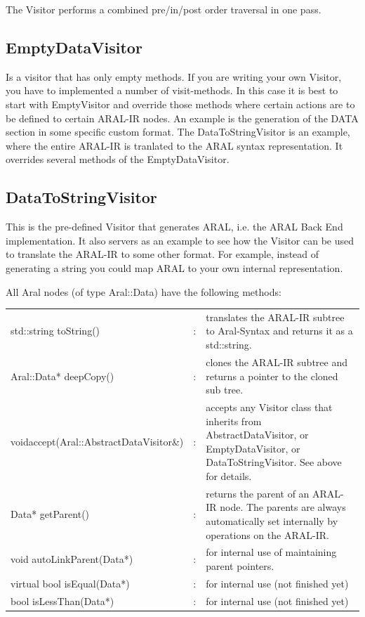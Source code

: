\documentclass[a4paper,12pt]{report}
\begin{document}
The Visitor performs a combined pre/in/post order traversal in one pass.

\subsection{EmptyDataVisitor}
Is a visitor that has only empty methods. If you are writing your own
Visitor, you have to implemented a number of visit-methods. In this
case it is best to start with EmptyVisitor and override those methods
where certain actions are to be defined to certain ARAL-IR nodes. An example is the
generation of the DATA section in some specific custom format. The DataToStringVisitor
is an example, where the entire ARAL-IR is tranlated to the ARAL syntax representation. It overrides
several methods of the EmptyDataVisitor.

\subsection{DataToStringVisitor}
This is the pre-defined Visitor that generates ARAL, i.e. the ARAL
Back End implementation. It also servers as an example to see how the
Visitor can be used to translate the ARAL-IR to some other format. For
example, instead of generating a string you could map ARAL to your own
internal representation.

All Aral nodes (of type Aral::Data) have the following methods:

\begin{tabular}{p{6cm}cp{7.2cm}}
std::string toString()& :& translates the ARAL-IR subtree to Aral-Syntax and
                         returns it as a std::string.\\

Aral::Data* deepCopy()& : &clones the ARAL-IR subtree and returns a
                         pointer to the cloned sub tree.\\
void\newline accept(Aral::AbstractDataVisitor\&)& :& accepts any Visitor class that inherits
                         from AbstractDataVisitor, or EmptyDataVisitor, 
                         or DataToStringVisitor. See above for details.\\
Data* getParent()   &  :& returns the parent of an ARAL-IR node. The parents are always
                         automatically set internally by operations on the ARAL-IR.\\

void autoLinkParent(Data*)& : &for internal use of maintaining parent pointers.\\
virtual bool isEqual(Data*)&: &for internal use (not finished yet)\\
bool isLessThan(Data*)     &:& for internal use (not finished yet)\\
\end{tabular}
\end{document}
